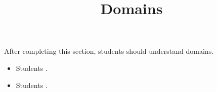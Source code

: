 \documentclass{ximera}
\title{Domains}
\begin{document}
\begin{abstract}
\end{abstract}

\maketitle

\begin{sectionOutcomes}

After completing this section, students should understand domains. 

\begin{itemize}
\item Students .
\item Students .
\end{itemize}

\end{sectionOutcomes}
\end{document}
